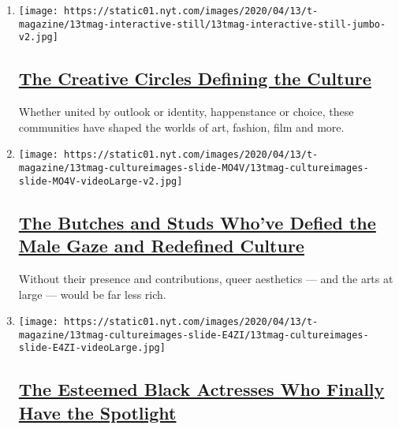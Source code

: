 \begin{enumerate}
\def\labelenumi{\arabic{enumi}.}
\item
  \texttt{[image: https://static01.nyt.com/images/2020/04/13/t-magazine/13tmag-interactive-still/13tmag-interactive-still-jumbo-v2.jpg]}

  \hypertarget{the-creative-circles-defining-the-culture}{%
  \subsection{\texorpdfstring{\href{/interactive/2020/04/13/t-magazine/culture-issue-2020.html}{The
  Creative Circles Defining the
  Culture}}{The Creative Circles Defining the Culture}}\label{the-creative-circles-defining-the-culture}}

  Whether united by outlook or identity, happenstance or choice, these
  communities have shaped the worlds of art, fashion, film and more.
\item
  \texttt{[image: https://static01.nyt.com/images/2020/04/13/t-magazine/13tmag-cultureimages-slide-MO4V/13tmag-cultureimages-slide-MO4V-videoLarge-v2.jpg]}

  \hypertarget{the-butches-and-studs-whove-defied-the-male-gaze-and-redefined-culture}{%
  \subsection{\texorpdfstring{\href{/interactive/2020/04/13/t-magazine/butch-stud-lesbian.html}{The
  Butches and Studs Who've Defied the Male Gaze and Redefined
  Culture}}{The Butches and Studs Who've Defied the Male Gaze and Redefined Culture}}\label{the-butches-and-studs-whove-defied-the-male-gaze-and-redefined-culture}}

  Without their presence and contributions, queer aesthetics --- and the
  arts at large --- would be far less rich.
\item
  \texttt{[image: https://static01.nyt.com/images/2020/04/13/t-magazine/13tmag-cultureimages-slide-E4ZI/13tmag-cultureimages-slide-E4ZI-videoLarge.jpg]}

  \hypertarget{the-esteemed-black-actresses-who-finally-have-the-spotlight}{%
  \subsection{\texorpdfstring{\href{/interactive/2020/04/13/t-magazine/black-actresses-bassett-berry-blige-henson-whitfield-elise.html}{The
  Esteemed Black Actresses Who Finally Have the
  Spotlight}}{The Esteemed Black Actresses Who Finally Have the Spotlight}}\label{the-esteemed-black-actresses-who-finally-have-the-spotlight}}


\end{enumerate}
